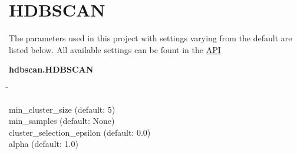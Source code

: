 \section{HDBSCAN} \label{sec:HDBSCAN}

\blindtext
\autocite{mcinnes_hdbscan_2017}
\autocite{malzer_hybrid_2020}

The parameters used in this project with settings varying from the default are listed below. All available settings can be fount in the \href{https://hdbscan.readthedocs.io/en/latest/api.html}{API}

\begin{leftbar}
    \textbf{hdbscan.HDBSCAN}
    \begin{nstabbing}
        \qquad\qquad\qquad\qquad\qquad\quad\=\kill

        min\_cluster\_size \> (default: 5)\\
        
        min\_samples \> (default: None)\\
        
        cluster\_selection\_epsilon \> (default: 0.0)\\
        
        alpha \> (default: 1.0)
    \end{nstabbing}
\end{leftbar}

